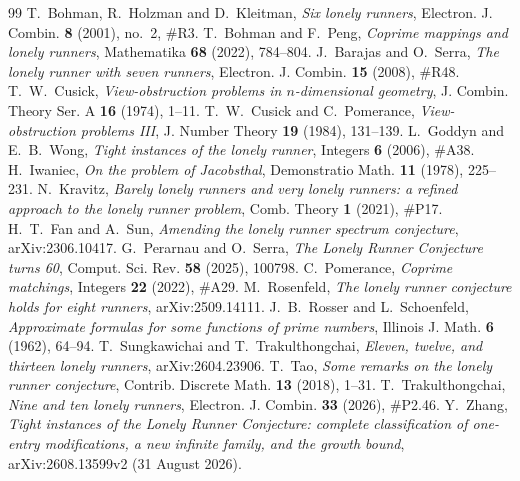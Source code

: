 \documentclass[11pt]{amsart}
\theoremstyle{plain}
\theoremstyle{definition}
\begin{document}
\begin{thebibliography}{99}
 T.~Bohman, R.~Holzman and D.~Kleitman, \emph{Six lonely runners}, Electron. J. Combin. \textbf{8} (2001), no.~2, \#R3.
 T.~Bohman and F.~Peng, \emph{Coprime mappings and lonely runners}, Mathematika \textbf{68} (2022), 784--804.
 J.~Barajas and O.~Serra, \emph{The lonely runner with seven runners}, Electron. J. Combin. \textbf{15} (2008), \#R48.
 T.~W.~Cusick, \emph{View-obstruction problems in $n$-dimensional geometry}, J. Combin. Theory Ser. A \textbf{16} (1974), 1--11.
 T.~W.~Cusick and C.~Pomerance, \emph{View-obstruction problems III}, J. Number Theory \textbf{19} (1984), 131--139.
 L.~Goddyn and E.~B.~Wong, \emph{Tight instances of the lonely runner}, Integers \textbf{6} (2006), \#A38.
 H.~Iwaniec, \emph{On the problem of Jacobsthal}, Demonstratio Math. \textbf{11} (1978), 225--231.
 N.~Kravitz, \emph{Barely lonely runners and very lonely runners: a refined approach to the lonely runner problem}, Comb. Theory \textbf{1} (2021), \#P17.
 H.~T.~Fan and A.~Sun, \emph{Amending the lonely runner spectrum conjecture}, arXiv:2306.10417.
 G.~Perarnau and O.~Serra, \emph{The Lonely Runner Conjecture turns 60}, Comput. Sci. Rev. \textbf{58} (2025), 100798.
 C.~Pomerance, \emph{Coprime matchings}, Integers \textbf{22} (2022), \#A29.
 M.~Rosenfeld, \emph{The lonely runner conjecture holds for eight runners}, arXiv:2509.14111.
 J.~B.~Rosser and L.~Schoenfeld, \emph{Approximate formulas for some functions of prime numbers}, Illinois J. Math. \textbf{6} (1962), 64--94.
 T.~Sungkawichai and T.~Trakulthongchai, \emph{Eleven, twelve, and thirteen lonely runners}, arXiv:2604.23906.
 T.~Tao, \emph{Some remarks on the lonely runner conjecture}, Contrib. Discrete Math. \textbf{13} (2018), 1--31.
 T.~Trakulthongchai, \emph{Nine and ten lonely runners}, Electron. J. Combin. \textbf{33} (2026), \#P2.46.
 Y.~Zhang, \emph{Tight instances of the Lonely Runner Conjecture: complete classification of one-entry modifications, a new infinite family, and the growth bound}, arXiv:2608.13599v2 (31 August 2026).
\end{thebibliography}
\end{document}
